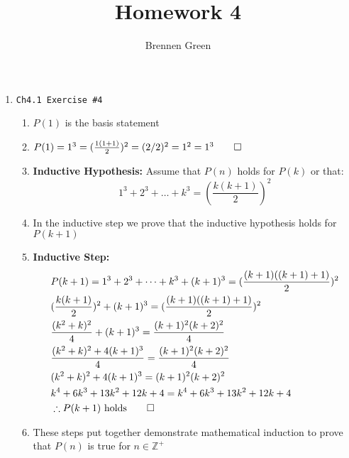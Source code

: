 \documentclass[11pt]{article}
\begin{document}
\title{Homework 4}
\author{Brennen Green}
\maketitle


\begin{enumerate}
    \item \begin{verbatim}Ch4.1 Exercise #4\end{verbatim}
        \begin{enumerate}
            \item $ P(1) $ is the basis statement 
            \item $ P(1) = 1^3 = (\frac{1(1+1)}{2})^2 = (2/2)^2 = 1^2 = 1^3 \qed$
            \item \textbf{Inductive Hypothesis:}  Assume that $P(n)$ holds for $P(k)$ or that:
                $$1^3 + 2^3 + \dots + k^3 = (\frac{k(k+1)}{2})^2$$
            \item In the inductive step we prove that the inductive hypothesis holds for $P(k+1)$
            \item \textbf{Inductive Step:}
                \begin{align*}
                    &  P(k+1) = 1^3 + 2^3 + \dots + k^3 + (k+1)^3 = (\frac{(k+1)((k+1)+1)}{2})^2 \\
                    & (\frac{k(k+1)}{2})^2 + (k+1)^3 = (\frac{(k+1)((k+1)+1)}{2})^2 \\
                    & \frac{(k^2+k)^2}{4} + (k+1)^3 = \frac{(k+1)^2(k+2)^2}{4} \\
                    & \frac{(k^2+k)^2+ 4(k+1)^3}{4} = \frac{(k+1)^2(k+2)^2}{4} \\
                    & (k^2+k)^2+ 4(k+1)^3 = (k+1)^2(k+2)^2 \\
                    & k^4+6k^3+13k^2+12k+4=k^4+6k^3+13k^2+12k+4 \\
                    & \therefore P(k+1) \text{ holds} \qed 
                \end{align*}
            \item These steps put together demonstrate mathematical induction to prove that $P(n)$ is
            true for $ n \in \mathbb{Z}^+ $
        \end{enumerate}
    
    \newpage
    

\end{enumerate}
\end{document}
